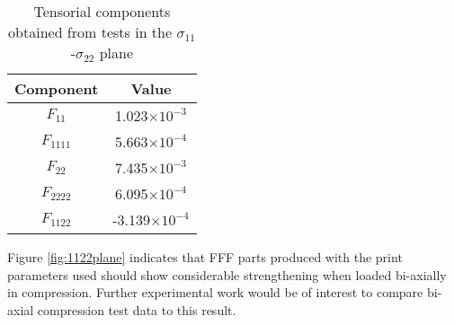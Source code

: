 \documentclass[main.tex]{subfiles}
\begin{document}
\begin{table} [h]
	\centering
	\caption{Tensorial components obtained from tests in the $\sigma_{11}$-$\sigma_{22}$ plane}
	\begin{tabular}{ c c } 
		\toprule
		\textbf{Component} & \textbf{Value} \\
		\midrule
		$F_{11}$ & 1.023$\times 10^{-3}$\\ [1ex]
		$F_{1111}$ & 5.663$\times 10^{-4}$\\ [1ex]
		$F_{22}$ & 7.435$\times 10^{-3}$\\ [1ex]
		$F_{2222}$ & 6.095$\times 10^{-4}$\\ [1ex]
		$F_{1122}$ & -3.139$\times 10^{-4}$\\ [1ex]
		\bottomrule
	\end{tabular}
	\label{tab:1122calc}
\end{table}  

Figure \ref{fig:1122plane} indicates that FFF parts produced with the print parameters used should show considerable strengthening when loaded bi-axially in compression. Further experimental work would be of interest to compare bi-axial compression test data to this result.
% 

\end{document}
